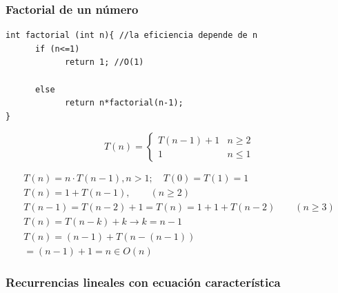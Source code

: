 \documentclass[10pt,a4paper,spanish]{report}
\theoremstyle{definition}
\theoremstyle{remark}
\begin{document}
\subsubsection{\textcolor[rgb]{0.1,0.2,1}Factorial de un número}
\label{ej_factorial}

\begin{verbatim}
int factorial (int n){ //la eficiencia depende de n
      if (n<=1)
            return 1; //O(1)

      else
            return n*factorial(n-1);
}
\end{verbatim}

\begin{displaymath}
T(n) = \left\{ \begin{array}{ll}
T(n-1)+1  &  n \geq 2\\
1         &  n \leq 1
\end{array} \right.
\end{displaymath}

\begin{center}
\begin{align}
T(n) = n \cdot T(n - 1), n > 1; \quad T(0) = T(1) = 1\\
T(n) = 1 + T(n-1), \qquad(n \geq 2)\\
T(n-1) = T(n-2) + 1 = T(n) = 1 + 1 + T(n-2) \qquad (n \geq 3)\\
T(n) = T(n - k) + k \rightarrow k = n-1\\
T(n) = (n-1) + T(n - (n-1)) \\
= (n - 1) + 1 = n \in O(n)
\end{align}
\end{center}

\subsubsection{\textcolor[rgb]{0.1,0.2,1}Recurrencias lineales con ecuación característica}
\label{ejemplos_ec_car_lin}
\end{document}
